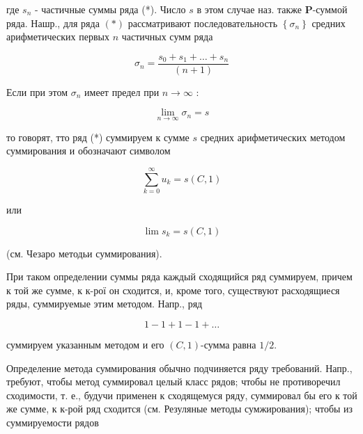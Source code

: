 \documentclass[10pt]{article}
\begin{document}
где $s_{n}$ - частичные суммы ряда (*). Число $s$ в этом случае наз. также $\boldsymbol{P}$-суммой ряда. Нашр., для ряда $(*)$ рассматривают последовательность $\left\{\sigma_{n}\right\}$ средних арифметических первых $n$ частичных сумм ряда



\[

\sigma_{n}=\frac{s_{0}+s_{1}+\ldots+s_{n}}{(n+1)}

\]



Если при этом $\sigma_{n}$ имеет предел при $n \rightarrow \infty$ :



\[

\lim _{n \rightarrow \infty} \sigma_{n}=s

\]



то говорят, тто ряд (*) суммируем к сумме $s$ средних арифметических методом суммирования и обозначают символом



\[

\sum_{k=0}^{\infty} u_{k}=s(C, 1)

\]



или



\[

\lim s_{k}=s(C, 1)

\]



(см. Чезаро методьи суммирования).



При таком определении суммы ряда каждый сходящийся ряд суммируем, причем к той же сумме, к к-рої он сходится, и, кроме того, существуют расходящиеся ряды, суммируемые этим методом. Напр., ряд



\[

1-1+1-1+\ldots

\]



суммируем указанным методом и его $(C, 1)$-сумма равна $1 / 2$.



Определение метода суммирования обычно подчиняется ряду требований. Напр., требуют, чтобы метод суммировал целый класс рядов; чтобы не противоречил сходимости, т. е., будучи применен к сходящемуся ряду, суммировал бы его к той же сумме, к к-рой ряд сходится (см. Резуляные методы сумжирования); чтобы из суммируемости рядов
\end{document}
